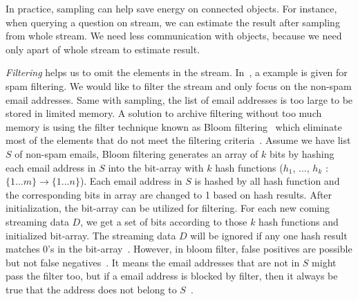 

In practice, sampling can help save energy on connected objects. For instance,
when querying a question on stream, we can estimate the result after sampling
from whole stream. We need less communication with objects, because we need only
apart of whole stream to estimate result.

\emph{Filtering} helps us to omit the elements in the stream.
In~\cite{leskovec2014mining}, a example is given for spam filtering. We would
like to filter the stream and only focus on the non-spam email addresses. Same
with sampling, the list of email addresses is too large to be stored in limited
memory. A solution to archive filtering without too much memory is using the
filter technique known as Bloom filtering~\cite{bloom1970space} which eliminate
most of the elements that do not meet the filtering
criteria~\cite{leskovec2014mining}. Assume we have list $S$ of non-spam emails,
Bloom filtering generates an array of $k$ bits by hashing each email address in
$S$ into the bit-array with $k$ hash functions ($h_1$, ..., $h_k$ : $\{1...m\}
\rightarrow \{1...n\}$). Each email address in $S$ is hashed by all hash
function and the corresponding bits in array are changed to 1 based on hash
results. After initialization, the bit-array can be utilized for filtering. For
each new coming streaming data $D$, we get a set of bits according to those $k$
hash functions and initialized bit-array. The streaming data $D$ will be ignored
if any one hash result matches 0's in the bit-array~\cite{leskovec2014mining}.
However, in bloom filter, false positives are possible but not false
negatives~\cite{ahmed2019data}. It means the email addresses that are not in $S$
might pass the filter too, but if a email address is blocked by filter, then it
always be true that the address does not belong to $S$~\cite{ahmed2019data}.

